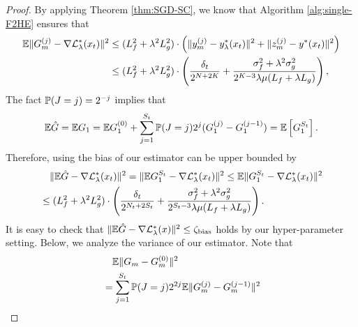 {\thminner* 
\begin{proof} %
By applying Theorem \ref{thm:SGD-SC}, we know that Algorithm \ref{alg:single-F2HE} ensures that
\begin{align} \label{eq:single-F2HE}
\begin{split}
    {\mathbb{E}} \Vert G_m^{(j)} - \nabla {\mathcal{L}}_{\lambda}^*(x_t) \Vert^2 & \le (L_f^2 + \lambda^2 L_g^2) \cdot \left( \Vert y_m^{(j)} - y_{\lambda}^*(x_t) \Vert^2 + \Vert z_m^{(j)} - y^*(x_t) \Vert^2 \right)  \\
    &\le (L_f^2 + \lambda^2 L_g^2)
    \cdot \left( \frac{\delta_t}{2^{N+2K}} + \frac{\sigma_f^2 + \lambda^2 \sigma_g^2}{2^{K-3} \lambda \mu (L_f + \lambda L_g)} \right),
\end{split}
\end{align}
The fact ${\mathbb{P}}(J=j)=2^{-j}$ implies that 
\begin{align*} 
    {\mathbb{E}} \hat G = {\mathbb{E}} G_1 = {\mathbb{E}} G_1^{(0)} + \sum_{j=1}^{S_t} {\mathbb{P}}(J=j) 2^j ( G_1^{(j)} - G_1^{(j-1)}  ) = {\mathbb{E}} \left[ G_1^{S_t} \right].
\end{align*}
Therefore, using  the bias of our estimator can be upper bounded by 
\begin{align*}
    &\quad \Vert {\mathbb{E}} \hat G - \nabla {\mathcal{L}}_{\lambda}^*(x_t) \Vert^2 = \Vert {\mathbb{E}} G_1^{S_t} - \nabla {\mathcal{L}}_{\lambda}^*(x_t) \Vert^2 \le {\mathbb{E}} \Vert G_1^{S_t} - \nabla {\mathcal{L}}_{\lambda}^*(x_t) \Vert^2 \\
    &\le (L_f^2 + \lambda^2 L_g^2)\cdot \left( \frac{\delta_t}{2^{N_t +2 S_t}} + \frac{\sigma_f^2 + \lambda^2 \sigma_g^2}{2^{S_t-3} \lambda \mu (L_f + \lambda L_g)  } \right).
\end{align*}
It is easy to check that $\Vert {\mathbb{E}} \hat G - \nabla {\mathcal{L}}_{\lambda}^*(x) \Vert^2 \le \zeta_{\rm bias}$ holds by our hyper-parameter setting. 
Below, we analyze the variance of our estimator. Note that
\begin{align*}
    &\quad \BE \Vert G_m - G_m^{(0)} \Vert^2 \\
    &= \sum_{j=1}^{S_t} \BP( J = j) 2^{2j} \BE \Vert G_m^{(j)} - G_m^{(j-1)} \Vert^2 \\

\end{align*}
\end{proof}}
